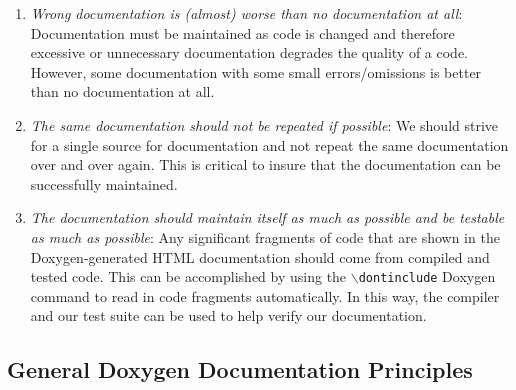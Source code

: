 \begin{enumerate}
{}\item\textit{Wrong documentation is (almost) worse than no documentation at
all}: Documentation must be maintained as code is changed and therefore
excessive or unnecessary documentation degrades the quality of a code.
However, some documentation with some small errors/omissions is better than no
documentation at all.

{}\item\textit{The same documentation should not be repeated if possible}: We
should strive for a single source for documentation and not repeat the same
documentation over and over again.  This is critical to insure that the
documentation can be successfully maintained.

{}\item\textit{The documentation should maintain itself as much as possible
and be testable as much as possible}: Any significant fragments of code that
are shown in the Doxygen-generated HTML documentation should come from compiled
and tested code.  This can be accomplished by using the
{}\texttt{$\backslash$dontinclude} Doxygen command to read in code fragments
automatically.  In this way, the compiler and our test suite can be used to
help verify our documentation.

\end{enumerate}

%
\subsection{General Doxygen Documentation Principles}
%

